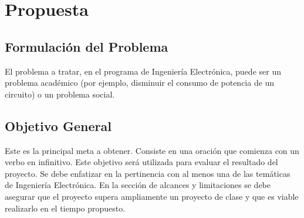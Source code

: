 \documentclass{article}
\begin{document}
\section*{\sc Propuesta}
\subsection*{Formulación del Problema}
\noindent 
El problema a tratar, en el programa de Ingeniería Electrónica, puede ser un problema académico (por ejemplo, disminuir el consumo de potencia de un circuito) o un problema social.   




\subsection*{Objetivo General}
\noindent Este es la principal meta a obtener. Consiste en una oración que comienza con un verbo en infinitivo. Este objetivo será utilizada para evaluar el resultado del proyecto. Se debe enfatizar en la pertinencia con al menos una de las temáticas de Ingeniería Electrónica. En la sección de alcances y limitaciones se debe asegurar que el proyecto supera ampliamente un proyecto de clase y que es viable realizarlo en el tiempo propuesto.
\end{document}
